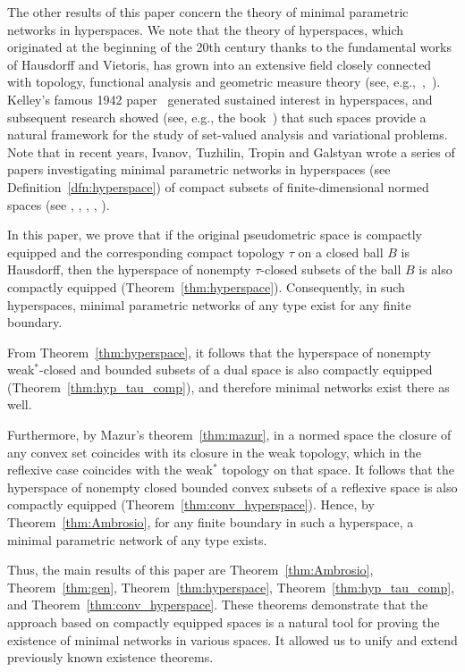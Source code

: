 \documentclass{svproc}
\begin{document}
The other results of this paper concern the theory of minimal parametric networks in hyperspaces. We note that the theory of hyperspaces, which originated at the beginning of the 20th century thanks to the fundamental works of Hausdorff and Vietoris, has grown into an extensive field closely connected with topology, functional analysis and geometric measure theory (see, e.g.,~\cite{Nadler},~\cite{Blackburn}). Kelley's famous 1942 paper~\cite{Kelley} generated sustained interest in hyperspaces, and subsequent research showed (see, e.g., the book~\cite{SetAn}) that such spaces provide a natural framework for the study of set-valued analysis and variational problems. Note that in recent years, Ivanov, Tuzhilin, Tropin and Galstyan wrote a series of papers investigating minimal parametric networks in hyperspaces (see Definition~\ref{dfn:hyperspace}) of compact subsets of finite-dimensional normed spaces (see \cite{Tropin}, \cite{ITT}, \cite{Tropin_2}, \cite{Gals_1}, \cite{Gals_2}).

In this paper, we prove that if the original pseudometric space is compactly equipped and the corresponding compact topology $\tau$ on a closed ball $B$ is Hausdorff, then the hyperspace of nonempty $\tau$-closed subsets of the ball $B$ is also compactly equipped (Theorem~\ref{thm:hyperspace}). Consequently, in such hyperspaces, minimal parametric networks of any type exist for any finite boundary.

From Theorem~\ref{thm:hyperspace}, it follows that the hyperspace of nonempty weak$^*$-closed and bounded subsets of a dual space is also compactly equipped (Theorem~\ref{thm:hyp_tau_comp}), and therefore minimal networks exist there as well.

Furthermore, by Mazur's theorem~\ref{thm:mazur}, in a normed space the closure of any convex set coincides with its closure in the weak topology, which in the reflexive case coincides with the weak$^*$ topology on that space. It follows that the hyperspace of nonempty closed bounded convex subsets of a reflexive space is also compactly equipped (Theorem~\ref{thm:conv_hyperspace}). Hence, by Theorem~\ref{thm:Ambrosio}, for any finite boundary in such a hyperspace, a minimal parametric network of any type exists.

Thus, the main results of this paper are Theorem~\ref{thm:Ambrosio}, Theorem~\ref{thm:gen}, Theorem~\ref{thm:hyperspace}, Theorem~\ref{thm:hyp_tau_comp}, and Theorem~\ref{thm:conv_hyperspace}. These theorems demonstrate that the approach based on compactly equipped spaces is a natural tool for proving the existence of minimal networks in various spaces. It allowed us to unify and extend previously known existence theorems.
\end{document}
